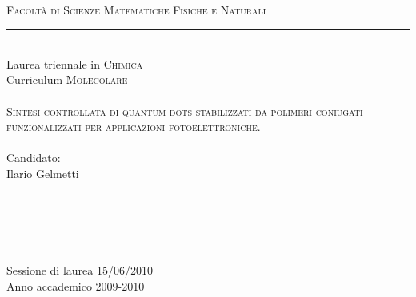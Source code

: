 \documentclass[a4paper, italian, 
, 12pt
, openright
]{book}
\begin{document}
\pagestyle{empty}
\cleardoublepage

\begin{titlepage}\begin{center}
	\\%
   	\large{\textsc{Facoltà di Scienze Matematiche Fisiche e Naturali}}\\
		\rule{5cm}{1pt}\\
	{\small{Laurea triennale in \textsc{Chimica}}}\\
	{\small{Curriculum \textsc{Molecolare}}}\\
		\makebox[\textwidth]{\rule{0pt}{.06\textheight}}\\
	\LARGE{\textsc{Sintesi controllata di quantum dots stabilizzati da polimeri coniugati funzionalizzati per applicazioni fotoelettroniche.}}\\
		\makebox[\textwidth]{\rule{0pt}{.03\textheight}}\\
	\footnotesize{Candidato:}\\
	\large{Ilario Gelmetti}\\
		\makebox[.2\textwidth]{\rule{0pt}{.02\textheight}}\\
\end{center}
\begin{small}
\bigskip
\makebox[\textwidth]{\rule{0pt}{.01\textheight}}\\
	\begin{center}
	\rule{3cm}{1pt}\\
	Sessione di laurea 15/06/2010\\
	Anno accademico 2009-2010\\
	\end{center}
\end{small}
\end{titlepage}
\end{document}
